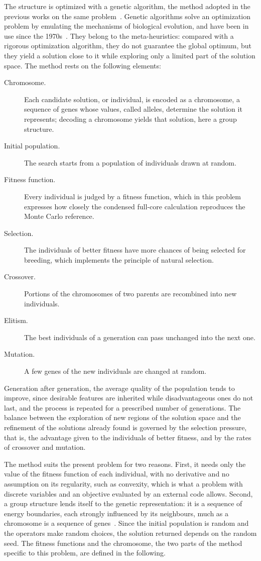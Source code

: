 The structure is optimized with a genetic algorithm, the method adopted in the
previous works on the same
problem~\citetext{\citealp{lfrGA2022}; \citealp{lfrGA2024}; \citealp{prevGA}; \citealp{prevMulti}}.
Genetic algorithms solve an optimization problem by emulating the mechanisms of
biological evolution, and have been in use since the 1970s~\citep{holland1975}.
They belong to the meta-heuristics: compared with a rigorous optimization
algorithm, they do not guarantee the global optimum, but they yield a solution
close to it while exploring only a limited part of the solution space. The method rests
on the following elements:
\begin{description}
  \item[Chromosome.] Each candidate solution, or individual, is encoded as a
    chromosome, a sequence of genes whose values, called alleles, determine the
    solution it represents; decoding a chromosome yields that solution, here a
    group structure.
  \item[Initial population.] The search starts from a population of
    individuals drawn at random.
  \item[Fitness function.] Every individual is judged by a fitness function,
    which in this problem expresses how closely the condensed full-core
    calculation reproduces the Monte Carlo reference.
  \item[Selection.] The individuals of better fitness have more chances of
    being selected for breeding, which implements the principle of natural
    selection.
  \item[Crossover.] Portions of the chromosomes of two parents are recombined
    into new individuals.
  \item[Elitism.] The best individuals of a generation can pass unchanged into
    the next one.
  \item[Mutation.] A few genes of the new individuals are changed at random.
\end{description}
Generation after generation, the average quality of the population tends to
improve, since desirable features are inherited while disadvantageous ones do
not last, and the process is repeated for a prescribed number of generations.
The balance between the exploration of new regions of the solution space and
the refinement of the solutions already found is governed by the selection
pressure, that is, the advantage given to the individuals of better fitness,
and by the rates of crossover and mutation.

The method suits the present problem for two reasons. First, it needs only the
value of the fitness function of each individual, with no derivative and no
assumption on its regularity, such as convexity, which is what a problem with
discrete variables and an objective evaluated by an external code allows.
Second, a group structure lends itself to the genetic representation: it is a
sequence of energy boundaries, each strongly influenced by its neighbours, much
as a chromosome is a sequence of genes~\citep{prevGA}. Since the initial
population is random and the operators make random choices, the solution
returned depends on the random seed. The fitness functions and the
chromosome, the two parts of the method specific to this problem, are defined
in the following.

